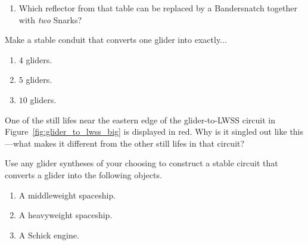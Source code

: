 \begin{multicols}{2}
\begin{problem}
\begin{enumerate}[label=\bf\color{ocre}(\alph*)]
			\item Which reflector from that table can be replaced by a Bandersnatch together with \emph{two} Snarks?
		\end{enumerate}
	\end{problem}
	
	
	\mfilbreak
	
	
	\begin{problemstar}\label{exer:convert_more_gliders} 
		Make a stable conduit that converts one glider into exactly...\smallskip
		
		\begin{enumerate}[label=\bf\color{ocre}(\alph*)]
			\item $4$ gliders.
			
			\item $5$ gliders.
			
			\item $10$ gliders.
		\end{enumerate}
	\end{problemstar}
	
	
	\mfilbreak
	
	
	\begin{problem}\label{exer:glider_to_lwss_weird_sl} 
		One of the still lifes near the eastern edge of the glider-to-LWSS circuit in Figure~\ref{fig:glider_to_lwss_big} is displayed in red. Why is it singled out like this---what makes it different from the other still lifes in that circuit?
	\end{problem}


	
	
	\mfilbreak
	
	
	\begin{problem}\label{exer:convert_stable_g_to_spaceships}
		Use any glider syntheses of your choosing to construct a stable circuit that converts a glider into the following objects.\smallskip
		
		\begin{enumerate}[label=\bf\color{ocre}(\alph*)]
			\item {} A middleweight spaceship.
			
			\item {} A heavyweight spaceship.
			
			\item {} A Schick engine.
		\end{enumerate}
	\end{problem}



\end{multicols}
